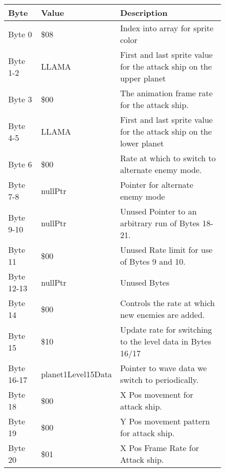 \begin{figure}[H]
  {
  \setlength{\tabcolsep}{3.0pt}
  \setlength\cmidrulewidth{\heavyrulewidth} %
  \begin{adjustbox}{width=12cm}

\begin{tabular}{lll}
\toprule
 Byte       & Value              & Description                                                         \\
\midrule
 Byte 0     & \$08                & Index into array for sprite color                                   \\
 Byte 1-2   & LLAMA              & First and last sprite value for the attack ship on the upper planet \\
 Byte 3     & \$00                & The animation frame rate for the attack ship.                       \\
 Byte 4-5   & LLAMA              & First and last sprite value for the attack ship on the lower planet \\
 Byte 6     & \$00                & Rate at which to switch to alternate enemy mode.                    \\
 Byte 7-8   & nullPtr            & Pointer for alternate enemy mode                                    \\
 Byte 9-10  & nullPtr            & Unused Pointer to an arbitrary run of Bytes 18-21.                  \\
 Byte 11    & \$00                & Unused Rate limit for use of Bytes 9 and 10.                        \\
 Byte 12-13 & nullPtr            & Unused Bytes                                                        \\
 Byte 14    & \$00                & Controls the rate at which new enemies are added.                   \\
 Byte 15    & \$10                & Update rate for switching to the level data in Bytes 16/17          \\
 Byte 16-17 & planet1Level15Data & Pointer to wave data we switch to periodically.                     \\
 Byte 18    & \$00                & X Pos movement for attack ship.                                     \\
 Byte 19    & \$00                & Y Pos movement pattern for attack ship.                             \\
 Byte 20    & \$01                & X Pos Frame Rate for Attack ship.                                   \\

\end{tabular}
\end{adjustbox}}
\end{figure}
